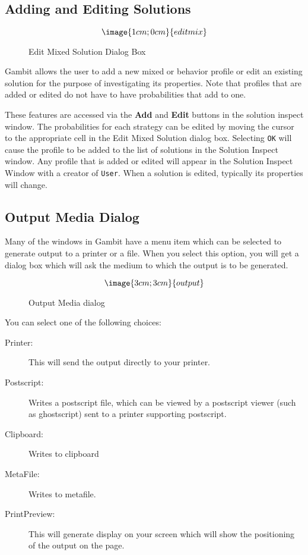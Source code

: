 \subsection{Adding and Editing Solutions}\label{SolnAddEdit}
\begin{figure}
$$\image{1cm;0cm}{editmix}$$
\caption{Edit Mixed Solution Dialog Box}\label{fig_nfgsortfilt}
\end{figure}

Gambit allows the user to add a new mixed or behavior profile or edit
an existing solution for the purpose of investigating its properties.
Note that profiles that are added or edited do not have to have
probabilities that add to one.

These features are accessed via the {\bf Add} and {\bf Edit} buttons
in the solution inspect window.  The probabilities for each strategy
can be edited by moving the cursor to the appropriate cell in the Edit
Mixed Solution dialog box.  Selecting {\tt OK} will cause the profile
to be added to the list of solutions in the Solution Inspect window.
Any profile that is added or edited will appear in the Solution
Inspect Window with a creator of {\tt User}.  When a solution is
edited, typically its properties will change.

\subsection{Output Media Dialog}\label{OutputMedia}\label{outputsec}

Many of the windows in Gambit have a menu item which can be 
selected to generate output to a printer or a file.  When you select this 
option, you will get a dialog box which will ask the medium to which the 
output is to be generated.  

\begin{figure}
$$\image{3cm;3cm}{output}$$
\caption{Output Media dialog}\label{fig_outputmedia}
\end{figure}

You can select one of the following choices:

\begin{description}
\item[Printer:] This will send the output directly to your printer. 
\item[Postscript:] Writes a postscript file, which can be viewed by a 
postscript viewer (such as ghostscript) sent to a printer 
supporting postscript.  
\item[Clipboard:] Writes to clipboard
\item[MetaFile:] Writes to metafile.  
\item[PrintPreview:]  This will generate display on your screen which will 
show the positioning of the output on the page.   
\end{description}

